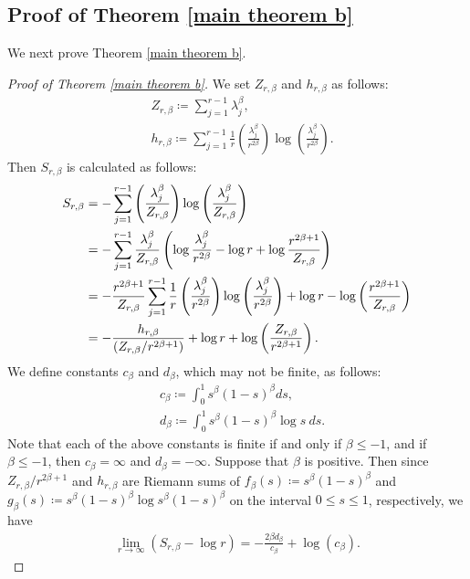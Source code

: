 \documentclass[12pt]{article}
\theoremstyle{definition}
\begin{document}
\subsection{Proof of Theorem \ref{main theorem b}}
We next prove Theorem \ref{main theorem b}.
\begin{proof}[Proof of Theorem \ref{main theorem b}] 
We set $Z_{r,\beta}$ and $h_{r,\beta}$ as follows:
\begin{align}
&Z_{r,\beta}\coloneqq \sum_{j=1}^{r-1}\lambda_j^\beta, \label{naze}\\
&h_{r,\beta}\coloneqq \sum_{j=1}^{r-1}\frac{1}{r}\left(\frac{\lambda_j^\beta}{r^{2\beta}}\right) \log\left(\frac{\lambda_j^\beta}{r^{2\beta}}\right).
\label{er}
\end{align}
Then $S_{r,\beta}$ is calculated as follows:
\begin{align}
S_{r,\beta}&=-\sum_{j=1}^{r-1}\left(\frac{\lambda_j^\beta}{Z_{r,\beta}}\right)\log\left(\frac{\lambda_j^\beta}{Z_{r,\beta}}\right) \notag \\ 
&=-\sum_{j=1}^{r-1}\frac{\lambda_j^\beta}{Z_{r,\beta}} \left(\log\frac{\lambda_j^\beta}{r^{2\beta}}-\log r+\log\frac{r^{2\beta+1}}{Z_{r,\beta}}\right) \notag \\
&=-\frac{r^{2\beta+1}}{Z_{r,\beta}}\sum_{j=1}^{r-1}\frac{1}{r}\left(\frac{\lambda_j^\beta}{r^{2\beta}}\right) \log\left(\frac{\lambda_j^\beta}{r^{2\beta}}\right)+\log r-\log\left(\frac{r^{2\beta+1}}{Z_{r,\beta}}\right) \notag \\
&=-\frac{h_{r,\beta}}{(Z_{r,\beta}/r^{2\beta+1})}+\log r+\log\left(\frac{Z_{r,\beta}}{r^{2\beta+1}}\right). \label{Srb}
\end{align}
We define constants $c_\beta$ and $d_\beta$, which may not be finite, as follows:
\begin{align*}
&c_\beta\coloneqq \int_0^1s^\beta(1-s)^\beta ds, \\
&d_\beta\coloneqq \int_0^1s^\beta(1-s)^\beta \log s\ ds.
\end{align*}
Note that each of the above constants is finite if and only if $\beta\leq -1$, and if $\beta\leq -1$, then $c_\beta=\infty$ and $d_\beta=-\infty$. Suppose that $\beta$ is positive. Then since $Z_{r,\beta}/r^{2\beta+1}$ and $h_{r,\beta}$ are Riemann sums of $f_\beta(s)\coloneqq s^\beta(1-s)^\beta$ and $g_\beta (s)\coloneqq s^\beta(1-s)^\beta\log s^\beta(1-s)^\beta$ on the interval $0\leq s\leq 1$, respectively, we have 
\begin{align*}
\lim_{r\to\infty} (S_{r,\beta}-\log r)=-\frac{2\beta d_\beta}{c_\beta}+\log(c_\beta).

\end{align*}
\end{proof}
\end{document}
